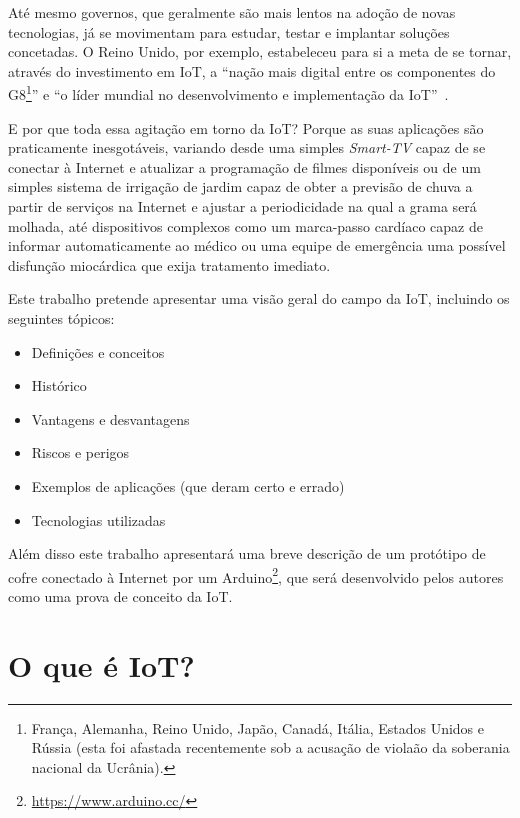 \documentclass[pdftex, brazil, 12pt, twoside]{article}
\newcommand{\ingles}[1]{\textit{#1}}
\begin{document}
Até mesmo governos, que geralmente são mais lentos na adoção de novas tecnologias, já
se movimentam para estudar, testar e implantar soluções concetadas. O Reino Unido,
por exemplo, estabeleceu para si a meta de se tornar, através do investimento em IoT,
a ``nação mais digital entre os componentes do G8\footnote{França, Alemanha, Reino Unido,
  Japão, Canadá, Itália, Estados Unidos e Rússia (esta foi afastada recentemente sob
  a acusação de violaão da soberania nacional da Ucrânia).}'' e 
``o líder mundial no desenvolvimento e implementação da IoT''~\citep{UKGOSWalportIoT2014}.

E por que toda essa agitação em torno da IoT? Porque as suas aplicações
são praticamente inesgotáveis, variando desde uma simples
\ingles{Smart-TV} capaz de se conectar à Internet e atualizar a programação de
filmes disponíveis ou de um simples sistema de irrigação de jardim capaz de
obter a previsão de chuva a partir de serviços na Internet e ajustar a periodicidade
na qual a grama será molhada, até dispositivos complexos como um marca-passo cardíaco
capaz de informar automaticamente ao médico ou uma equipe de emergência uma possível
disfunção miocárdica que exija tratamento imediato.

Este trabalho pretende apresentar uma visão geral do campo da IoT, incluindo os
seguintes tópicos:

\begin{itemize}[noitemsep]
\item Definições e conceitos
\item Histórico
\item Vantagens e desvantagens
\item Riscos e perigos
\item Exemplos de aplicações (que deram certo e errado)
\item Tecnologias utilizadas
\end{itemize}

Além disso este trabalho apresentará uma breve descrição de um protótipo de
cofre conectado à Internet por um Arduino\footnote{\url{https://www.arduino.cc/}},
que será desenvolvido pelos autores como uma prova de conceito da IoT.


\section{O que é IoT?}
\label{o-que-e-iot}
\end{document}
